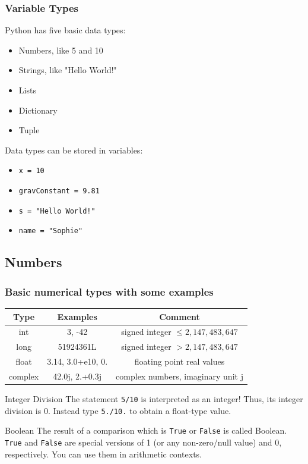 \documentclass{beamer}
\begin{document}
\begin{frame}
\frametitle{Variable Types}
	Python has five basic data types:
	\begin{itemize}
		\item Numbers, like 5 and 10
		\item Strings, like "Hello World!"
		\item Lists
		\item Dictionary
		\item Tuple
	\end{itemize}
	Data types can be stored in variables:
	\begin{itemize}
		\item  \texttt{x = 10}
		\item  \texttt{gravConstant = 9.81}
		\item  \texttt{s = "Hello World!"}
		\item  \texttt{name = "Sophie"}
	\end{itemize}
\end{frame}

\subsection{Numbers}

\begin{frame}
\frametitle{Basic numerical types with some examples}
	\begin{tabular}{c|c|c}
		Type & Examples & Comment \\ \hline
		int  & 3, -42 &  signed integer $ \leq 2,147,483,647$\\
		long & 51924361L & signed integer $>2,147,483,647$ \\
		float & 3.14, 3.0+e10, 0. & floating point real values \\
		complex & 42.0j, 2.+0.3j & complex numbers, imaginary unit j
 	\end{tabular}
 	
 	\begin{alertblock}{Integer Division}
 		The statement \texttt{5/10} is interpreted as an integer! Thus, its integer division is 0. Instead type 			\texttt{5./10.} to obtain a float-type value.
 	\end{alertblock}
 	\begin{block}{Boolean}
 		The result of a comparison which is \texttt{True} or \texttt{False} is called Boolean. \texttt{True} and 			\texttt{False} are special versions of 1 (or any non-zero/null value) and 0, respectively. You can use them in arithmetic contexts.
 	\end{block}	
\end{frame}
\end{document}
